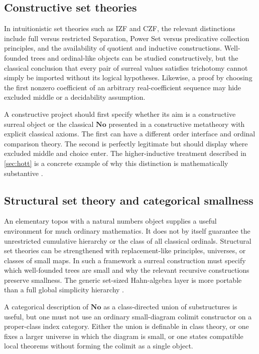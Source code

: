 \documentclass[11pt,letterpaper]{article}
\theoremstyle{definition}
\theoremstyle{remark}
\newcommand{\No}{\mathbf{No}}
\numberwithin{equation}{section}
\begin{document}
\subsection{Constructive set theories}
In intuitionistic set theories such as IZF and CZF, the relevant distinctions include full versus restricted Separation, Power Set versus predicative collection principles, and the availability of quotient and inductive constructions. Well-founded trees and ordinal-like objects can be studied constructively, but the classical conclusion that every pair of surreal values satisfies trichotomy cannot simply be imported without its logical hypotheses. Likewise, a proof by choosing the first nonzero coefficient of an arbitrary real-coefficient sequence may hide excluded middle or a decidability assumption.

A constructive project should first specify whether its aim is a constructive surreal object or the classical \(\No\) presented in a constructive metatheory with explicit classical axioms. The first can have a different order interface and ordinal comparison theory. The second is perfectly legitimate but should display where excluded middle and choice enter. The higher-inductive treatment described in \cref{sec:hott} is a concrete example of why this distinction is mathematically substantive \cite{HoTTBook,ShulmanPlump}.

\subsection{Structural set theory and categorical smallness}
An elementary topos with a natural numbers object supplies a useful environment for much ordinary mathematics. It does not by itself guarantee the unrestricted cumulative hierarchy or the class of all classical ordinals. Structural set theories can be strengthened with replacement-like principles, universes, or classes of small maps. In such a framework a surreal construction must specify which well-founded trees are small and why the relevant recursive constructions preserve smallness. The generic set-sized Hahn-algebra layer is more portable than a full global simplicity hierarchy \cite[\S\S13--15]{ShulmanSize}.

A categorical description of \(\No\) as a class-directed union of substructures is useful, but one must not use an ordinary small-diagram colimit constructor on a proper-class index category. Either the union is definable in class theory, or one fixes a larger universe in which the diagram is small, or one states compatible local theorems without forming the colimit as a single object.
\end{document}
